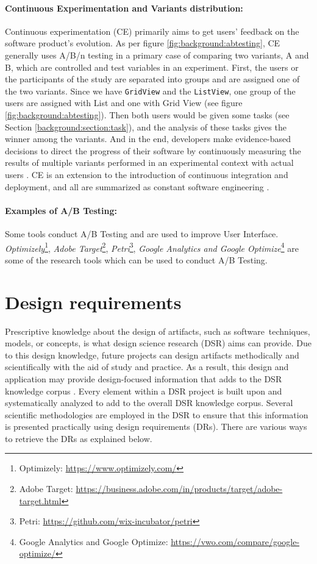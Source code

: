 \paragraph{Continuous Experimentation and Variants distribution:} 
Continuous experimentation (CE) primarily aims to get users' feedback on the software product's evolution.
As per figure \ref{fig:background:abtesting}, CE generally uses A/B/n testing in a primary case of comparing two variants, A and B, which are controlled and test variables in an experiment.
First, the users or the participants of the study are separated into groups and are assigned one of the two variants.
Since we have \texttt{GridView} and the \texttt{ListView}, one group of the users are assigned with List and one with Grid View (see figure \ref{fig:background:abtesting}).
Then both users would be given some tasks (see Section \ref{background:section:task}), and the analysis of these tasks gives the winner among the variants.  
And in the end, developers make evidence-based decisions to direct the progress of their software by continuously measuring the results of multiple variants performed in an experimental context with actual users \cite{article:CE:ros}.
CE is an extension to the introduction of continuous integration and deployment, and all are summarized as constant software engineering \cite{article:CE:fitzgerald}.

\paragraph{Examples of A/B Testing:}
Some tools conduct A/B Testing and are used to improve User Interface. \textit{Optimizely}\footnote{Optimizely: \url{https://www.optimizely.com/}}, \textit{Adobe Target}\footnote{Adobe Target: \url{https://business.adobe.com/in/products/target/adobe-target.html}}, \textit{Petri}\footnote{Petri: \url{https://github.com/wix-incubator/petri}}, \textit{Google Analytics and Google Optimize}\footnote{Google Analytics and Google Optimize: \url{https://vwo.com/compare/google-optimize/}} are some of the research tools which can be used to conduct A/B Testing.

\clearpage

\section{Design requirements}
\label{background:section:designReqs}
Prescriptive knowledge about the design of artifacts, such as software techniques, models, or concepts, is what design science research (DSR) aims can provide. 
Due to this design knowledge, future projects can design artifacts methodically and scientifically with the aid of study and practice. 
As a result, this design and application may provide design-focused information that adds to the DSR knowledge corpus \cite{misc:dsr:henver}.
Every element within a DSR project is built upon and systematically analyzed to add to the overall DSR knowledge corpus.
Several scientific methodologies are employed in the DSR to ensure that this information is presented practically using design requirements (DRs).
There are various ways to retrieve the DRs as explained below.

